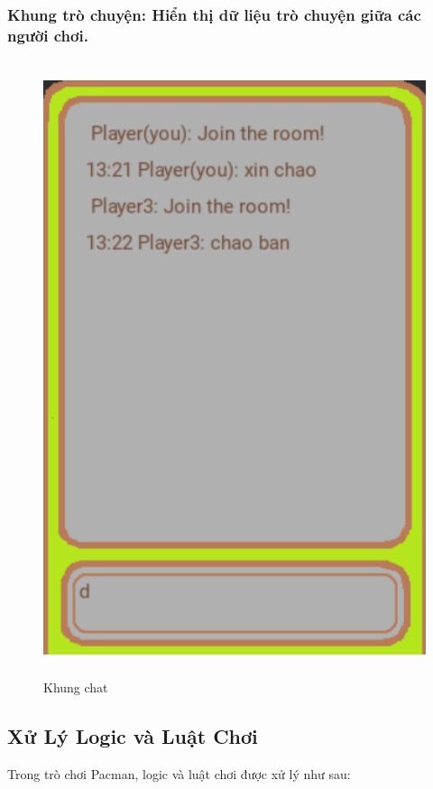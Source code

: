 \documentclass[a4paper]{article}
\begin{document}
\subsubsection{Khung trò chuyện: Hiển thị dữ liệu trò chuyện giữa các người chơi.}
\begin{figure}[h!]
    \centering
    \includegraphics[valign=20cm, height=18cm]{messageBox.png}
    \caption{Khung chat}
\end{figure}


\newpage
\subsection{Xử Lý Logic và Luật Chơi}

Trong trò chơi Pacman, logic và luật chơi được xử lý như sau:
\end{document}
